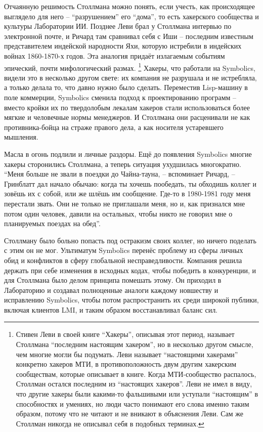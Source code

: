 Отчаянную решимость Столлмана можно понять, если учесть, как происходящее выглядело для него -- \enquote{разрушением} его \enquote{дома}, то есть хакерского сообщества и культуры Лаборатории ИИ. Позднее Леви брал у Столлмана интервью по электронной почте, и Ричард там сравнивал себя с Иши -- последним известным представителем индейской народности Яхи, которую истребили в индейских войнах 1860-1870-х годов. Эта аналогия придаёт излагаемым событиям эпический, почти мифологический размах. \footnote{Стивен Леви в своей книге \enquote{Хакеры}, описывая этот период, называет Столлмана \enquote{последним настоящим хакером}, но в несколько другом смысле, чем многие могли бы подумать. Леви называет \enquote{настоящими хакерами} конкретно хакеров МТИ, в противоположность двум другим хакерским сообществам, которые описывает в книге. Когда МТИ-сообщество распалось, Столлман остался последним из \enquote{настоящих хакеров}. Леви не имел в виду, что другие хакеры были какими-то фальшивыми или уступали \enquote{настоящим} в способностях и умениях, но люди часто понимают его слова именно таким образом, потому что не читают и не вникают в объяснения Леви. Сам же Столлман никогда не описывал себя в подобных терминах.} Хакеры, что работали на Symbolics, видели это в несколько другом свете: их компания не разрушала и не истребляла, а только делала то, что давно нужно было сделать. Переместив Lisp-машину в поле коммерции, Symbolics сменила подход к проектированию программ -- вместо кройки их по твердолобым лекалам хакеров стали использоваться более мягкие и человечные нормы менеджеров. И Столлмана они расценивали не как противника-бойца на страже правого дела, а как носителя устаревшего мышления.

Масла в огонь подлили и личные раздоры. Ещё до появления Symbolics многие хакеры сторонились Столлмана, а теперь ситуация ухудшилась многократно. \enquote{Меня больше не звали в поездки до Чайна-тауна, -- вспоминает Ричард, -- Гринблатт дал начало обычаю: когда ты хочешь пообедать, ты обходишь коллег и зовёшь их с собой, или же шлёшь им сообщение. Где-то в 1980-1981 году меня перестали звать. Они не только не приглашали меня, но и, как признался мне потом один человек, давили на остальных, чтобы никто не говорил мне о планируемых поездах на обед}.

Столлману было больно попасть под остракизм своих коллег, но ничего поделать с этим он не мог. Ультиматум Symbolics перенёс проблему из сферы личных обид и конфликтов в сферу глобальной несправедливости. Компания решила держать при себе изменения в исходных кодах, чтобы победить в конкуренции, и для Столлмана было делом принципа помешать этому. Он приходил в Лабораторию и создавал полноценные аналоги каждому новшеству и исправлению Symbolics, чтобы потом распространить их среди широкой публики, включая клиентов LMI, и таким образом восстанавливал баланс сил.


